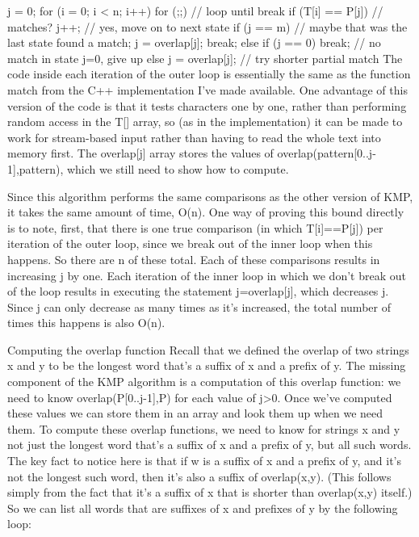     j = 0;
    for (i = 0; i < n; i++)
    for (;;) {      // loop until break
        if (T[i] == P[j]) { // matches?
        j++;        // yes, move on to next state
        if (j == m) {   // maybe that was the last state
            found a match;
            j = overlap[j];
        }
        break;
        } else if (j == 0) break;   // no match in state j=0, give up
        else j = overlap[j];    // try shorter partial match
    }
The code inside each iteration of the outer loop is essentially the same as the function match from the C++ implementation I've made available. One advantage of this version of the code is that it tests characters one by one, rather than performing random access in the T[] array, so (as in the implementation) it can be made to work for stream-based input rather than having to read the whole text into memory first. The overlap[j] array stores the values of overlap(pattern[0..j-1],pattern), which we still need to show how to compute.

Since this algorithm performs the same comparisons as the other version of KMP, it takes the same amount of time, O(n). One way of proving this bound directly is to note, first, that there is one true comparison (in which T[i]==P[j]) per iteration of the outer loop, since we break out of the inner loop when this happens. So there are n of these total. Each of these comparisons results in increasing j by one. Each iteration of the inner loop in which we don't break out of the loop results in executing the statement j=overlap[j], which decreases j. Since j can only decrease as many times as it's increased, the total number of times this happens is also O(n).

Computing the overlap function
Recall that we defined the overlap of two strings x and y to be the longest word that's a suffix of x and a prefix of y. The missing component of the KMP algorithm is a computation of this overlap function: we need to know overlap(P[0..j-1],P) for each value of j>0. Once we've computed these values we can store them in an array and look them up when we need them. To compute these overlap functions, we need to know for strings x and y not just the longest word that's a suffix of x and a prefix of y, but all such words. The key fact to notice here is that if w is a suffix of x and a prefix of y, and it's not the longest such word, then it's also a suffix of overlap(x,y). (This follows simply from the fact that it's a suffix of x that is shorter than overlap(x,y) itself.) So we can list all words that are suffixes of x and prefixes of y by the following loop:

